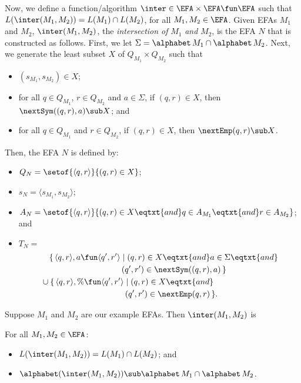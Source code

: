 Now, we define a function/algorithm
$\inter\in\EFA\times\EFA\fun\EFA$ such that
$L(\inter(M_1,M_2))=L(M_1)\cap L(M_2)$, for all $M_1,M_2\in\EFA$.
Given EFAs $M_1$ and $M_2$, $\inter(M_1,M_2)$, the \emph{intersection of}
$M_1$ \emph{and} $M_2$, is the EFA $N$ that is constructed as follows.
First, we let $\Sigma=\alphabet\,M_1\cap\alphabet\,M_2$.
Next, we generate the least subset $X$ of $Q_{M_1}\times Q_{M_2}$
such that
\begin{itemize}
\item $(s_{M_1},s_{M_2})\in X$;

\item for all $q\in Q_{M_1}$, $r\in Q_{M_2}$ and $a\in\Sigma$,
if $(q,r)\in X$, then $\nextSym((q,r),a)\sub X$; and

\item for all $q\in Q_{M_1}$ and $r\in Q_{M_2}$,
if $(q,r)\in X$, then $\nextEmp(q,r)\sub X$.
\end{itemize}
Then, the EFA $N$ is defined by:
\begin{itemize}
\item $Q_N=
\setof{\langle q,r\rangle}{(q,r)\in X}$;

\item $s_N=\langle s_{M_1},s_{M_2}\rangle$;

\item $A_N=\setof{\langle q,r\rangle}{(q,r)\in X\eqtxt{and}
q\in A_{M_1}\eqtxt{and}r\in A_{M_2}}$; and

\item $T_N={}$
  \begin{align*}
    &\quad \{\,\langle q,r\rangle,a\fun\langle
    q',r'\rangle\mid(q,r)\in X\eqtxt{and}
    a\in\Sigma\eqtxt{and}\\
    &\hspace{3.45cm}(q',r')\in\nextSym((q,r),a)\,\} \\
    &\cup
    \{\,\langle q,r\rangle,\%\fun\langle q',r'\rangle\mid(q,r)\in
    X\eqtxt{and} \\
    &\hspace{3.6cm}(q',r')\in\nextEmp(q,r)\,\}.
  \end{align*}
\end{itemize}

Suppose $M_1$ and $M_2$ are our example EFAs.
Then $\inter(M_1,M_2)$ is
\begin{center}

\end{center}

\begin{theorem}
For all $M_1,M_2\in\EFA$:
\begin{itemize}
\item $L(\inter(M_1,M_2))=L(M_1)\cap L(M_2)$; and

\item $\alphabet(\inter(M_1,M_2))\sub \alphabet\,M_1\cap\alphabet\,M_2$.
\end{itemize}
\end{theorem}

